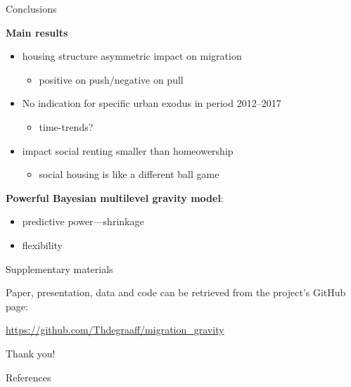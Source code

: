 \documentclass{beamer}
\begin{document}
\begin{frame}{Conclusions}

\textbf{Main results}
\begin{itemize}
  \item housing structure asymmetric impact on migration
  \begin{itemize}
	\item positive on push/negative on pull
  \end{itemize}
  \item No indication for specific \alert{urban} exodus in period 2012--2017
  \begin{itemize}
\item time-trends?
  \end{itemize}
  \item impact social renting smaller than homeowership
\citep{boyle1998migration}
	\begin{itemize}
	  \item social housing is like a \alert{different ball game}\newline
	\end{itemize}
\end{itemize}

\textbf{Powerful Bayesian multilevel gravity model}:
\begin{itemize}
  \item predictive power---shrinkage
  \item flexibility
\end{itemize}
\end{frame}

\begin{frame}{Supplementary materials}

Paper, presentation, data and code can be retrieved from the project's GitHub page: 

\begin{center}\url{https://github.com/Thdegraaff/migration\_gravity}\end{center}

\end{frame}

\begin{frame}[standout]
Thank you!
\end{frame}

\appendix

\begin{frame}[allowframebreaks]{References}

		\printbibliography[heading=none]

\end{frame}
\end{document}

